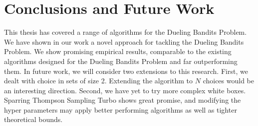\documentclass[MSc,beforeExam]{iitcsthesis}
\makeatletter
\newif\ifRP
\renewcommand{\RPtrue}{%
  \clearpage
  \ifRP\RPfalse\fi
  \global\let\ifRP\iftrue
}%
\renewcommand{\RPfalse}{%
  \clearpage
  \global\let\ifRP\iffalse
  \setbox\RPbox\vbox{\unvbox\RPbox
    \def\protect{\noexpand\protect\noexpand}%
    \@whilesw\ifdim0pt=\lastskip\fi
      {\c@page\lastkern\unkern\shipout\lastbox}%
  }%
}%
\makeatother
\begin{document}
\chapter{Conclusions and Future Work}
This thesis has covered a range of algorithms for the Dueling Bandits Problem.
We have shown in our work a novel approach for tackling the Dueling Bandits Problem.
We show promising empirical results, comparable to the existing algorithms designed for the Dueling Bandits Problem and far outperforming them.
In future work, we will consider two extensions to this research.
First, we dealt with choice in sets of size 2. Extending the algorithm to $N$ choices would be an interesting direction.
Second, we have yet to try more complex white boxes. Sparring Thompson Sampling Turbo shows great promise, and modifying the hyper parameters may apply better performing algorithms as well as tighter theoretical bounds.


\RPtrue


\RPfalse
\end{document}
